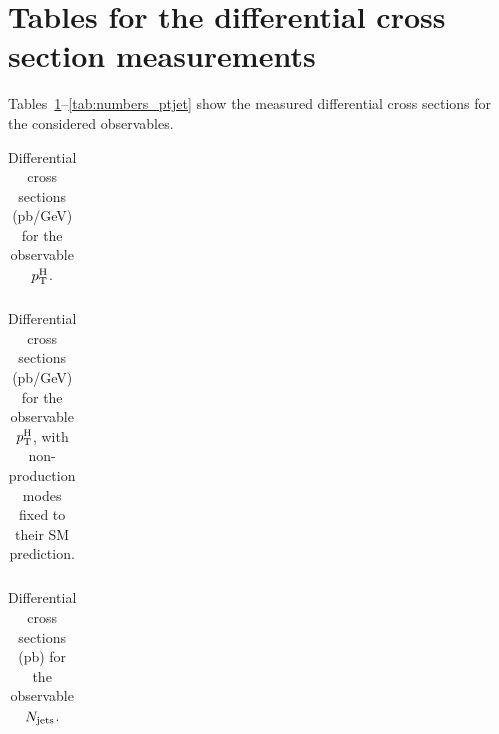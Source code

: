 
\section{Tables for the differential cross section measurements}
\label{sec:tables}

Tables~\ref{tab:numbers_pth_smH}--\ref{tab:numbers_ptjet} show the measured differential cross sections for the considered observables.

\begin{table}[h!]
    \caption{
        Differential cross sections (pb/GeV) for the observable $p_\mathrm{T}^\mathrm{H}$.
        }
    \label{tab:numbers_pth_smH}
    \scriptsize
    \begin{center}
    \begin{tabular}{|l|c|c|c|c|c|c|c|c|c|}
    \hline
     \\
    \hline
    \end{tabular}
    \end{center}
    \end{table}

\begin{table}[h!]
    \caption{
        Differential cross sections (pb/GeV) for the observable $p_\mathrm{T}^\mathrm{H}$, with non-\ggh production modes fixed to their SM prediction.
        }
    \label{tab:numbers_pth_ggH}
    \scriptsize
    \begin{center}
    \begin{tabular}{|l|c|c|c|c|c|c|c|c|c|}
    \hline
     \\
    \hline
    \end{tabular}
    \end{center}
    \end{table}


\begin{table}[h!]
    \caption{
        Differential cross sections (pb) for the observable $N_\text{jets} $.
        }
    \label{tab:numbers_njets}
    \scriptsize
    \begin{center}
    \begin{tabular}{|l|c|c|c|c|c|}
    \hline
     \\
    \hline
    \end{tabular}
    \end{center}
    \end{table}

